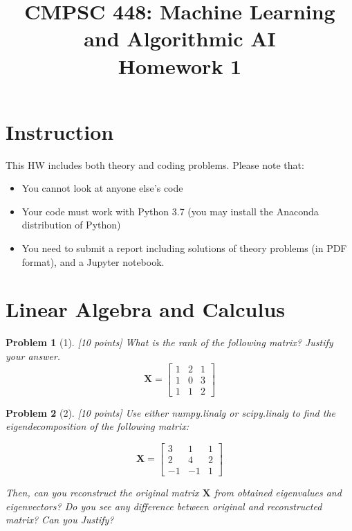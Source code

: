 \documentclass[11pt]{article}
\title{CMPSC 448: Machine Learning and Algorithmic AI \\ Homework 1}
\author{}
\date{}
\theoremstyle{quest}
\newtheorem*{problem}{Problem}
\begin{document}
\maketitle


\section*{Instruction}
This HW includes both theory and coding problems. Please note that:
\begin{itemize}
    \item You cannot look at anyone else's code
    \item Your code must work with Python 3.7 (you may install the Anaconda distribution of Python)
    \item You need to submit a report including solutions of theory problems (in PDF format), and a \textsf{Jupyter} notebook.
\end{itemize}

\section*{Linear Algebra and Calculus}
\begin{problem}[1] [10 points]
What is the rank of the following matrix? Justify your answer.
\begin{equation*}
    \bm{X} = \begin{bmatrix}
    1 & 2 & 1\\
    1 & 0 & 3\\
    1 & 1 & 2
    \end{bmatrix} 
\end{equation*}
\end{problem}

\begin{problem}[2]
[10 points] Use either \textsf{numpy.linalg} or \textsf{scipy.linalg} to find the eigendecomposition of the following matrix:

\begin{equation*}
\bm{X} = \begin{bmatrix}
3 & 1 & 1\\
2 & 4 & 2\\
-1 & -1 & 1
\end{bmatrix}   
\end{equation*}

Then, can you reconstruct the original matrix $\bm{X}$ from obtained eigenvalues and eigenvectors? Do you see any difference between original and reconstructed matrix? Can you Justify?
\end{problem}
\end{document}

